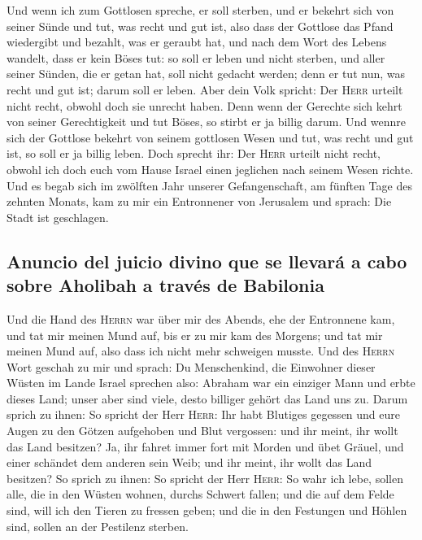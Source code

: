  Und wenn ich zum Gottlosen spreche, er soll sterben, und
er bekehrt sich von seiner Sünde und tut, was recht und gut ist,
 also dass der Gottlose das Pfand wiedergibt und bezahlt,
was er geraubt hat, und nach dem Wort des Lebens wandelt, dass er kein
Böses tut: so soll er leben und nicht sterben,  und aller
seiner Sünden, die er getan hat, soll nicht gedacht werden; denn er tut
nun, was recht und gut ist; darum soll er leben.  Aber
dein Volk spricht: Der \textsc{Herr} urteilt nicht recht, obwohl doch
sie unrecht haben.  Denn wenn der Gerechte sich kehrt von
seiner Gerechtigkeit und tut Böses, so stirbt er ja billig darum.
 Und wennre sich der Gottlose bekehrt von seinem
gottlosen Wesen und tut, was recht und gut ist, so soll er ja billig
leben.  Doch sprecht ihr: Der \textsc{Herr} urteilt nicht
recht, obwohl ich doch euch vom Hause Israel einen jeglichen nach seinem
Wesen richte.  Und es begab sich im zwölften Jahr unserer
Gefangenschaft, am fünften Tage des zehnten Monats, kam zu mir ein
Entronnener von Jerusalem und sprach: Die Stadt ist geschlagen.

\hypertarget{anuncio-del-juicio-divino-que-se-llevaruxe1-a-cabo-sobre-aholibah-a-travuxe9s-de-babilonia}{%
\subsection{Anuncio del juicio divino que se llevará a cabo sobre
Aholibah a través de
Babilonia}\label{anuncio-del-juicio-divino-que-se-llevaruxe1-a-cabo-sobre-aholibah-a-travuxe9s-de-babilonia}}

 Und die Hand des \textsc{Herrn} war über mir des Abends,
ehe der Entronnene kam, und tat mir meinen Mund auf, bis er zu mir kam
des Morgens; und tat mir meinen Mund auf, also dass ich nicht mehr
schweigen musste.  Und des \textsc{Herrn} Wort geschah zu
mir und sprach:  Du Menschenkind, die Einwohner dieser
Wüsten im Lande Israel sprechen also: Abraham war ein einziger Mann und
erbte dieses Land; unser aber sind viele, desto billiger gehört das Land
uns zu.  Darum sprich zu ihnen: So spricht der Herr
\textsc{Herr}: Ihr habt Blutiges gegessen und eure Augen zu den Götzen
aufgehoben und Blut vergossen: und ihr meint, ihr wollt das Land
besitzen?  Ja, ihr fahret immer fort mit Morden und übet
Gräuel, und einer schändet dem anderen sein Weib; und ihr meint, ihr
wollt das Land besitzen?  So sprich zu ihnen: So spricht
der Herr \textsc{Herr}: So wahr ich lebe, sollen alle, die in den Wüsten
wohnen, durchs Schwert fallen; und die auf dem Felde sind, will ich den
Tieren zu fressen geben; und die in den Festungen und Höhlen sind,
sollen an der Pestilenz sterben.

